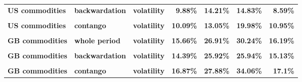 \documentclass[
  authoryear,
  preprint,
  3p]{elsarticle}
\begin{document}
\begin{longtable}[t]{>{}l>{}l>{}l>{}r>{}r>{}r>{}r}
\textbf{US commodities} & \textbf{backwardation} & \textbf{volatility} & \textcolor[HTML]{4285f4}{\textbf{9.88\%}} & \textcolor[HTML]{4285f4}{\textbf{14.21\%}} & \textcolor[HTML]{4285f4}{\textbf{14.83\%}} & \textcolor[HTML]{4285f4}{\textbf{8.59\%}}\\
\textbf{\cellcolor{gray!10}{US commodities}} & \textbf{\cellcolor{gray!10}{contango}} & \textbf{\cellcolor{gray!10}{mean}} & \textcolor[HTML]{4285f4}{\textbf{\cellcolor{gray!10}{-1.09\%}}} & \textcolor[HTML]{4285f4}{\textbf{\cellcolor{gray!10}{*16.16\%}}} & \textcolor[HTML]{4285f4}{\textbf{\cellcolor{gray!10}{4.9\%}}} & \textcolor[HTML]{4285f4}{\textbf{\cellcolor{gray!10}{-6.33\%}}}\\
\addlinespace
\textbf{US commodities} & \textbf{contango} & \textbf{volatility} & \textcolor[HTML]{4285f4}{\textbf{10.09\%}} & \textcolor[HTML]{4285f4}{\textbf{13.05\%}} & \textcolor[HTML]{4285f4}{\textbf{19.98\%}} & \textcolor[HTML]{4285f4}{\textbf{10.95\%}}\\
\textbf{\cellcolor{gray!10}{GB commodities}} & \textbf{\cellcolor{gray!10}{whole period}} & \textbf{\cellcolor{gray!10}{mean}} & \textcolor[HTML]{4285f4}{\textbf{\cellcolor{gray!10}{2.47\%}}} & \textcolor[HTML]{4285f4}{\textbf{\cellcolor{gray!10}{*21.77\%}}} & \textcolor[HTML]{4285f4}{\textbf{\cellcolor{gray!10}{5.25\%}}} & \textcolor[HTML]{4285f4}{\textbf{\cellcolor{gray!10}{2.72\%}}}\\
\textbf{GB commodities} & \textbf{whole period} & \textbf{volatility} & \textcolor[HTML]{4285f4}{\textbf{15.66\%}} & \textcolor[HTML]{4285f4}{\textbf{26.91\%}} & \textcolor[HTML]{4285f4}{\textbf{30.24\%}} & \textcolor[HTML]{4285f4}{\textbf{16.19\%}}\\
\textbf{\cellcolor{gray!10}{GB commodities}} & \textbf{\cellcolor{gray!10}{backwardation}} & \textbf{\cellcolor{gray!10}{mean}} & \textcolor[HTML]{4285f4}{\textbf{\cellcolor{gray!10}{4.41\%}}} & \textcolor[HTML]{4285f4}{\textbf{\cellcolor{gray!10}{8.01\%}}} & \textcolor[HTML]{4285f4}{\textbf{\cellcolor{gray!10}{15.06\%}}} & \textcolor[HTML]{4285f4}{\textbf{\cellcolor{gray!10}{**19.95\%}}}\\
\textbf{GB commodities} & \textbf{backwardation} & \textbf{volatility} & \textcolor[HTML]{4285f4}{\textbf{14.39\%}} & \textcolor[HTML]{4285f4}{\textbf{25.92\%}} & \textcolor[HTML]{4285f4}{\textbf{25.94\%}} & \textcolor[HTML]{4285f4}{\textbf{15.13\%}}\\
\addlinespace
\textbf{\cellcolor{gray!10}{GB commodities}} & \textbf{\cellcolor{gray!10}{contango}} & \textbf{\cellcolor{gray!10}{mean}} & \textcolor[HTML]{4285f4}{\textbf{\cellcolor{gray!10}{0.34\%}}} & \textcolor[HTML]{4285f4}{\textbf{\cellcolor{gray!10}{*35.56\%}}} & \textcolor[HTML]{4285f4}{\textbf{\cellcolor{gray!10}{-5.24\%}}} & \textcolor[HTML]{4285f4}{\textbf{\cellcolor{gray!10}{-14.05\%}}}\\
\textbf{GB commodities} & \textbf{contango} & \textbf{volatility} & \textcolor[HTML]{4285f4}{\textbf{16.87\%}} & \textcolor[HTML]{4285f4}{\textbf{27.88\%}} & \textcolor[HTML]{4285f4}{\textbf{34.06\%}} & \textcolor[HTML]{4285f4}{\textbf{17.1\%}}\\
\bottomrule


\end{longtable}
\end{document}

